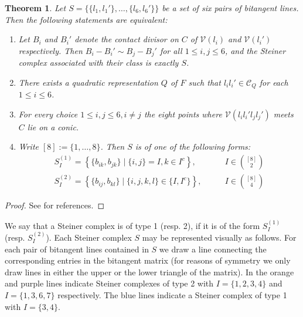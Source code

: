 \documentclass[a4paper,10pt]{amsart}
\theoremstyle{definition}
\theoremstyle{plain}
\newtheorem{thm}[Def]{Theorem}
\newcommand{\cC}{{\mathcal C}}
\newcommand{\cV}{{\mathcal V}}
\begin{document}
\begin{thm} \label{thm:steiner}
    Let $S = \{ \{l_1, l_1'\}, \dots, \{l_6, l_6'\} \}$ be a set of six pairs of bitangent lines. Then the following statements are equivalent:
    \begin{enumerate}
        \item Let $B_i$ and $B_i'$ denote the contact divisor on $C$ of $\cV(l_i)$ and $\cV(l_i')$ respectively. Then $B_i - B_i' \sim B_j - B_j'$ for all $1 \leq i,j \leq 6$, and the Steiner complex associated with their class is exactly $S$.
        
        \item There exists a quadratic representation $Q$ of $F$ such that $l_il_i' \in \cC_Q$ for each $1 \leq i \leq 6$.

        \item For every choice $1 \leq i,j \leq 6, i \neq j$ the eight points where $\cV(l_il_i'l_jl_j')$ meets $C$ lie on a conic.

        \item Write $[8] := \{1, \dots, 8\}$. Then $S$ is of one of the following forms:
        \begin{align*}
            S^{(1)}_I = \left\lbrace \{b_{ik}, b_{jk} \} \mid \{i,j\} = I, k \in I^c \right\rbrace, \qquad & I \in \binom{[8]}{2} \\
            S^{(2)}_I = \left\lbrace \{b_{ij}, b_{kl} \} \mid \{i,j,k,l\} \in \{I, I^c\} \right\rbrace, \qquad & I \in \binom{[8]}{4}
        \end{align*}
    \end{enumerate}
\end{thm}

\begin{proof}
    See \cite[Theorem 5.10]{plaumann} for references.
\end{proof}

We say that a Steiner complex is of type 1 (resp. 2), if it is of the form $S^{(1)}_I$ (resp. $S^{(2)}_I$). Each Steiner complex $S$ may be represented visually as follows. For each pair of bitangent lines contained in $S$ we draw a line connecting the corresponding entries in the bitangent matrix (for reasons of symmetry we only draw lines in either the upper or the lower triangle of the matrix). In  the orange and purple lines indicate Steiner complexes of type 2 with $I = \{1,2,3,4\}$ and $I = \{1,3,6,7\}$ respectively. The blue lines indicate a Steiner complex of type 1 with $I = \{3,4\}$.
\end{document}
